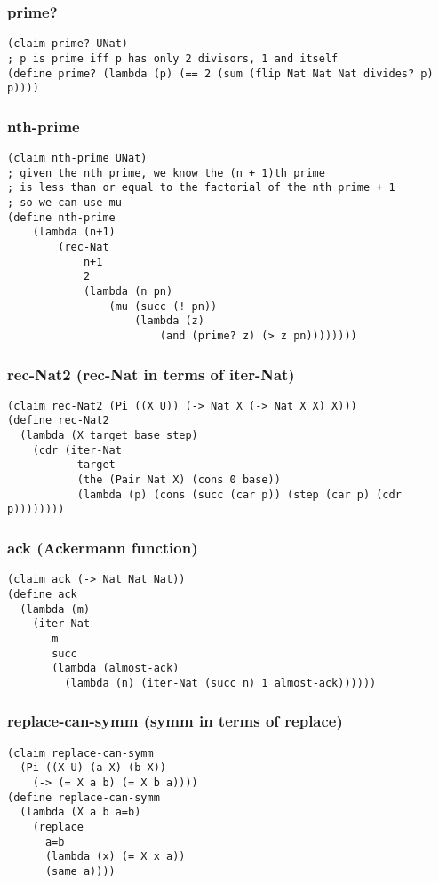 \subsubsection{prime?} \label{code:prime?}
\begin{verbatim}
(claim prime? UNat)
; p is prime iff p has only 2 divisors, 1 and itself
(define prime? (lambda (p) (== 2 (sum (flip Nat Nat Nat divides? p) p))))
\end{verbatim}

\subsubsection{nth-prime} \label{code:nth-prime}
\begin{verbatim}
(claim nth-prime UNat)
; given the nth prime, we know the (n + 1)th prime
; is less than or equal to the factorial of the nth prime + 1
; so we can use mu
(define nth-prime
    (lambda (n+1)
        (rec-Nat
            n+1
            2
            (lambda (n pn) 
                (mu (succ (! pn)) 
                    (lambda (z) 
                        (and (prime? z) (> z pn))))))))
\end{verbatim}

\subsubsection{rec-Nat2 (rec-Nat in terms of iter-Nat)} \label{code:rec-Nat2}
\begin{verbatim}
(claim rec-Nat2 (Pi ((X U)) (-> Nat X (-> Nat X X) X)))
(define rec-Nat2
  (lambda (X target base step)
    (cdr (iter-Nat
           target
           (the (Pair Nat X) (cons 0 base))
           (lambda (p) (cons (succ (car p)) (step (car p) (cdr p))))))))
\end{verbatim}

\subsubsection{ack (Ackermann function)} \label{code:ack}
\begin{verbatim}
(claim ack (-> Nat Nat Nat))
(define ack
  (lambda (m)
    (iter-Nat
       m
       succ
       (lambda (almost-ack)
         (lambda (n) (iter-Nat (succ n) 1 almost-ack))))))
\end{verbatim}

\subsubsection{replace-can-symm (symm in terms of replace)} \label{code:replace-can-symm}
\begin{verbatim}
(claim replace-can-symm
  (Pi ((X U) (a X) (b X))
    (-> (= X a b) (= X b a))))
(define replace-can-symm
  (lambda (X a b a=b)
    (replace
      a=b
      (lambda (x) (= X x a))
      (same a))))
\end{verbatim}

